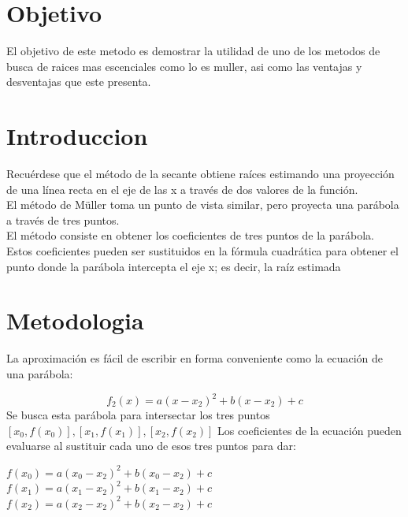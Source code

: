 \documentclass{article}
\begin{document}
\begin{multicols}{2}

\section{Objetivo}
\label{sec:obj}
  El objetivo de este metodo es demostrar la utilidad de uno de los metodos de busca de raices mas escenciales como lo es muller, asi como las ventajas y desventajas que este presenta.
\section{Introduccion}
\label{sec:intro}
Recuérdese que el método de la secante obtiene raíces estimando una proyección de una línea recta en el eje de las x a través de dos valores de la función.
\\
El método de Müller toma un punto de vista similar, pero proyecta una parábola a través de tres puntos.
\\
El método consiste en obtener los coeficientes de tres puntos de la parábola. 
\\
Estos coeficientes pueden ser sustituidos en la fórmula cuadrática para obtener el punto donde la parábola intercepta el eje x; es decir, la raíz estimada

\section{Metodologia}
\label{sec:Met}


La aproximación es fácil de escribir en forma conveniente como la ecuación de una parábola:

\begin{equation}
f_{2}(x)=a(x-x_{2})^{2}+b(x-x_{2})+c
\end{equation}
Se busca esta parábola para intersectar los tres puntos $[x_{0},f(x_{0})], [x_{1},f(x_{1})],[x_{2},f(x_{2})]$
Los coeficientes de la ecuación pueden evaluarse al sustituir cada uno de esos tres puntos para dar:
\begin{center}
$f(x_{0})=a(x_{0}-x_{2})^{2}+b(x_{0}-x_{2})+c
$
\\
$f(x_{1})=a(x_{1}-x_{2})^{2}+b(x_{1}-x_{2})+c$
\\
$f(x_{2})=a(x_{2}-x_{2})^{2}+b(x_{2}-x_{2})+c$
\end{center}


\end{multicols}
\end{document}
